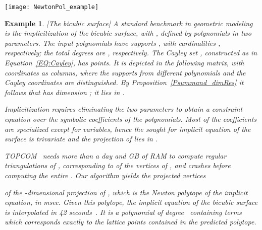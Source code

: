 \documentclass{article}
\newtheorem{example}{Example}
\begin{document}
\begin{figure*}[t] \centering
 \texttt{[image: NewtonPol\_example]}
 \caption{The Newton polytope of a polynomial of degree  in two variables.
Every monomial corresponds to an integral point on the plane. 
The dashed triangle is the corresponding polytope of the dense polynomial of
degree . 
\label{fig:NewPol}} 
\end{figure*}

\begin{example}\label{ExamBicubic}{\rm [The bicubic surface]}
A standard benchmark in geometric modeling is the implicitization of the
bicubic surface, with ,
defined by  polynomials in two parameters.
The input polynomials have supports
, with cardinalities , respectively;
the total degrees are , respectively. 
The Cayley set , constructed as in Equation~\ref{EQ:Cayley}, has
 points. It is depicted in the following matrix, with coordinates as
columns, where the supports from different polynomials and the Cayley
coordinates are distinguished.
By Proposition~\ref{Psummand_dimRes} it follows that  
has dimension ; it lies in .

\setlength{\tabcolsep}{0pt} \newcommand{\w}{3.8mm}  

Implicitization requires eliminating the two parameters to obtain a
constraint equation over the symbolic coefficients of the polynomials.
Most of the coefficients are specialized except for 
variables, hence the sought for implicit equation of the surface 
is trivariate and the projection of  lies in .

TOPCOM~ 
needs more than a day and GB of RAM to compute 
regular triangulations of , corresponding to  of the vertices of
, and crashes before computing the entire .
Our algorithm yields the projected vertices
 
of the -di\-men\-sional projection of ,
which is the Newton polytope of the implicit equation, in msec.
Given this polytope, the implicit equation of the 
bicubic surface is interpolated in 42 seconds~. 
It is a polynomial of degree~ containing  terms which corresponds
exactly to the lattice points contained in the predicted polytope.
\end{example} 
 
\end{document}
